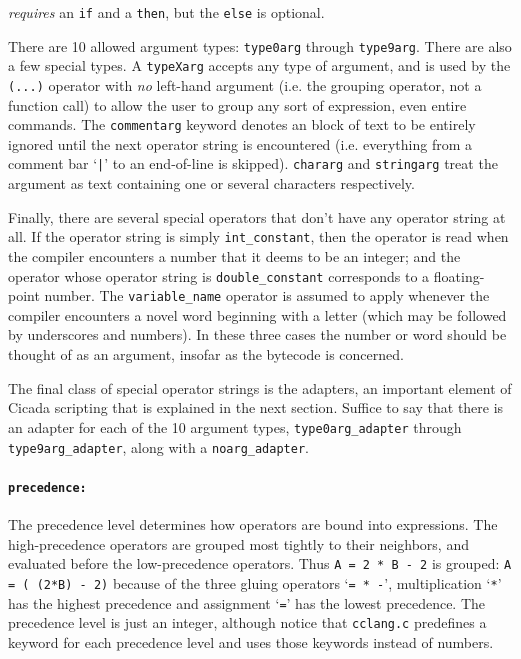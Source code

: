\documentclass{article}
\begin{document}
\noindent \emph{requires} an \verb#if# and a \verb#then#, but the \verb#else# is optional.

There are 10 allowed argument types:  \verb#type0arg# through \verb#type9arg#.  There are also a few special types.  A \verb#typeXarg# accepts any type of argument, and is used by the \verb#(...)# operator with \emph{no} left-hand argument (i.e. the grouping operator, not a function call) to allow the user to group any sort of expression, even entire commands.  The \verb#commentarg# keyword denotes an block of text to be entirely ignored until the next operator string is encountered (i.e. everything from a comment bar `\verb#|#' to an end-of-line is skipped).  \verb#chararg# and \verb#stringarg# treat the argument as text containing one or several characters respectively.

Finally, there are several special operators that don't have any operator string at all.  If the operator string is simply \verb#int_constant#, then the operator is read when the compiler encounters a number that it deems to be an integer; and the operator whose operator string is \verb#double_constant# corresponds to a floating-point number.  The \verb#variable_name# operator is assumed to apply whenever the compiler encounters a novel word beginning with a letter (which may be followed by underscores and numbers).  In these three cases the number or word should be thought of as an argument, insofar as the bytecode is concerned.

The final class of special operator strings is the adapters, an important element of Cicada scripting that is explained in the next section.  Suffice to say that there is an adapter for each of the 10 argument types, \verb#type0arg_adapter# through \verb#type9arg_adapter#, along with a \verb#noarg_adapter#.



\paragraph{\texttt{precedence:}}  The precedence level determines how operators are bound into expressions.  The high-precedence operators are grouped most tightly to their neighbors, and evaluated before the low-precedence operators.  Thus \verb#A = 2 * B - 2# is grouped:  \verb#A = ( (2*B) - 2)# because of the three gluing operators `\verb#= * -#', multiplication `\verb#*#' has the highest precedence and assignment `\verb#=#' has the lowest precedence.  The precedence level is just an integer, although notice that \verb#cclang.c# predefines a keyword for each precedence level and uses those keywords instead of numbers.
\end{document}
